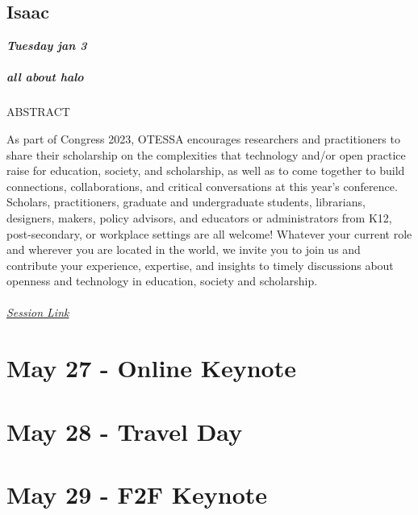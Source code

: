 \documentclass[
]{book}
\begin{document}
\hypertarget{isaac}{%
\section*{Isaac}\label{isaac}}

\textbf{\emph{Tuesday jan 3}}

\begin{keynote}
 \hypertarget{all-about-halo}{%
 \paragraph*{all about halo}\label{all-about-halo}}
 
 ABSTRACT
 
 As part of Congress 2023, OTESSA encourages researchers and
 practitioners to share their scholarship on the complexities that
 technology and/or open practice raise for education, society, and
 scholarship, as well as to come together to build connections,
 collaborations, and critical conversations at this year's conference.
 Scholars, practitioners, graduate and undergraduate students,
 librarians, designers, makers, policy advisors, and educators or
 administrators from K12, post-secondary, or workplace settings are all
 welcome! Whatever your current role and wherever you are located in the
 world, we invite you to join us and contribute your experience,
 expertise, and insights to timely discussions about openness and
 technology in education, society and scholarship.
 
 \hypertarget{session-link}{%
 \subparagraph*{\texorpdfstring{\href{}{Session
 Link}}{Session Link}}\label{session-link}}
 \end{keynote}

\hypertarget{may-27---online-keynote}{%
\chapter{May 27 - Online Keynote}\label{may-27---online-keynote}}

\hypertarget{may-28---travel-day}{%
\chapter{May 28 - Travel Day}\label{may-28---travel-day}}

\hypertarget{may-29---f2f-keynote}{%
\chapter{May 29 - F2F Keynote}\label{may-29---f2f-keynote}}
\end{document}
